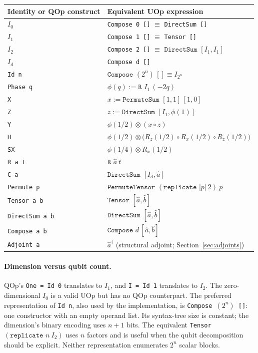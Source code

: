 \documentclass[11pt,a4paper]{article}
\newcommand{\code}[1]{\texttt{#1}}
\newcommand{\Ph}[1]{\phi(#1)}
\begin{document}
\begin{center}
\begingroup
\renewcommand{\arraystretch}{1.18}
\begin{tabularx}{\linewidth}{@{}lL@{}}
\toprule
Identity or QOp construct & Equivalent UOp expression\\
\midrule
$I_0$ & \code{Compose 0 []} $\equiv$ \code{DirectSum []}\\
$I_1$ & \code{Compose 1 []} $\equiv$ \code{Tensor []}\\
$I_2$ & \code{Compose 2 []} $\equiv$ $\code{DirectSum }[I_1,I_1]$\\
$I_d$ & \code{Compose d []}\\
\midrule
\code{Id n} & $\code{Compose }(2^n)\,[]\equiv I_{2^n}$\\
\code{Phase q} & $\Ph q:=\code{R }I_1\,(-2q)$\\
\code{X} & $x:=\code{PermuteSum }[1,1]\,[1,0]$\\
\code{Z} & $z:=\code{DirectSum }[I_1,\Ph1]$\\
\code{Y} & $\Ph{1/2}\otimes(x\circ z)$\\
\code{H} & $\Ph{1/2}\otimes
  \bigl(R_z(1/2)\circ R_x(1/2)\circ R_z(1/2)\bigr)$\\
\code{SX} & $\Ph{1/4}\otimes R_x(1/2)$\\
\code{R a t} & $\code{R }\widehat a\ t$\\
\code{C a} & $\code{DirectSum }[I_d,\widehat a]$\\
\code{Permute p} & $\code{PermuteTensor }(\code{replicate }|p|\ 2)\ p$\\
\code{Tensor a b} & $\code{Tensor }[\widehat a,\widehat b]$\\
\code{DirectSum a b} & $\code{DirectSum }[\widehat a,\widehat b]$\\
\code{Compose a b} & $\code{Compose }d\,[\widehat a,\widehat b]$\\
\code{Adjoint a} & $\widehat a^{\dagger}$ (structural adjoint; Section~\ref{sec:adjoints})\\
\bottomrule
\end{tabularx}
\endgroup
\end{center}

\paragraph{Dimension versus qubit count.}
QOp's \code{One = Id 0} translates to $I_1$, and
\code{I = Id 1} translates to $I_2$. The zero-dimensional $I_0$ is a
valid UOp but has no QOp counterpart. The preferred representation of
\code{Id n}, also used by the implementation, is
\code{Compose }$(2^n)$\code{ []}: one constructor with an empty operand
list. Its syntax-tree size is constant; the dimension's binary encoding
uses $n+1$ bits. The equivalent \code{Tensor }$(\code{replicate }n\ I_2)$
uses $n$ factors and is useful when the qubit decomposition should be
explicit. Neither representation enumerates $2^n$ scalar blocks.
\end{document}
